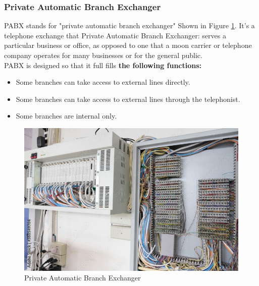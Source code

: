 \documentclass[12pt,fleqn]{book} %
\begin{document}
\subsubsection{Private Automatic Branch Exchanger}
PABX stands for "private automatic branch exchanger" Shown in Figure \ref{fig:hamdy 50}. It's a telephone exchange that Private Automatic Branch Exchanger: serves a particular business or office, as opposed to one that a moon carrier or telephone company operates for many businesses or for the general public.
\\ PABX is designed so that it full fills \textbf{the following functions:}
\begin{itemize}
    \item Some branches can take access to external lines directly.
    \item Some branches can take access to external lines through the telephonist.
    \item Some branches are internal only.
\end{itemize}
\begin{figure}[!h]
    \centering
    \includegraphics[width=1\linewidth]{hamdy 50.png}
    \caption{Private Automatic Branch Exchanger}
    \label{fig:hamdy 50}
    \end{figure}
\end{document}

